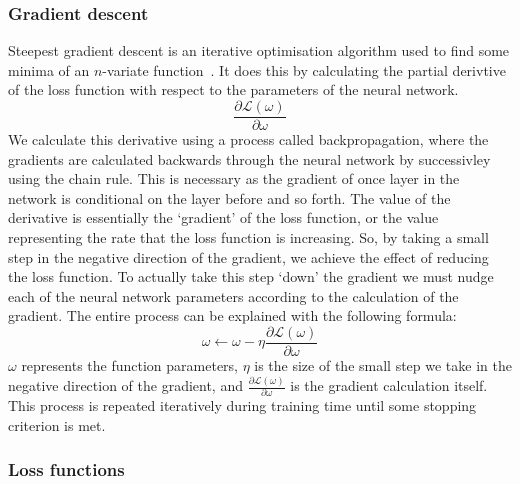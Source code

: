 \subsubsection{Gradient descent}\label{subsubsec:sgd}
Steepest gradient descent is an iterative optimisation algorithm used to find some minima of an $n$-variate function~\cite{ref}. It does this by calculating the partial derivtive of the loss function with respect to the parameters of the neural network.
\[\frac{\partial\mathcal{L}(\omega)}{\partial\omega}\]
We calculate this derivative using a process called backpropagation, where the gradients are calculated backwards through the neural network by successivley using the chain rule. This is necessary as the gradient of once layer in the network is conditional on the layer before and so forth. The value of the derivative is essentially the `gradient' of the loss function, or the value representing the rate that the loss function is increasing. So, by taking a small step in the negative direction of the gradient, we achieve the effect of reducing the loss function. To actually take this step `down' the gradient we must nudge each of the neural network parameters according to the calculation of the gradient. The entire process can be explained with the following formula:
\[\omega \leftarrow\omega - \eta\frac{\partial\mathcal{L}(\omega)}{\partial\omega}\]
$\omega$ represents the function parameters, $\eta$ is the size of the small step we take in the negative direction of the gradient, and $\frac{\partial\mathcal{L}(\omega)}{\partial\omega}$ is the gradient calculation itself. This process is repeated iteratively during training time until some stopping criterion is met.

\subsubsection{Loss functions}

